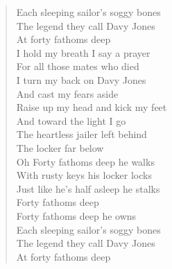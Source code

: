\documentclass[11pt]{article}
\begin{document}
\begin{verse}
Each sleeping sailor's soggy bones\\
The legend they call Davy Jones\\
At forty fathoms deep\\
\vspace*{1em}
I hold my breath I say a prayer\\
For all those mates who died\\
I turn my back on Davy Jones\\
And cast my fears aside\\
Raise up my head and kick my feet\\
And toward the light I go\\
The heartless jailer left behind\\
The locker far below\\
\vspace*{1em}
Oh Forty fathoms deep he walks\\
With rusty keys his locker locks\\
Just like he's half asleep he stalks\\
Forty fathoms deep\\
\vspace*{1em}
Forty fathoms deep he owns\\
Each sleeping sailor's soggy bones\\
The legend they call Davy Jones\\
At forty fathoms deep\\
\end{verse}
\clearpage
\end{document}
